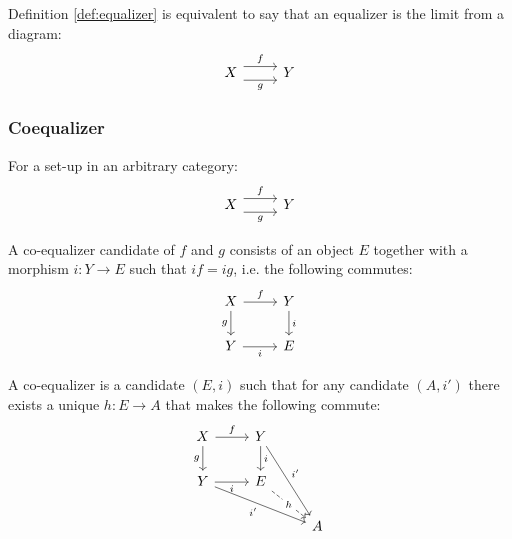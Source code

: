 \begin{definition}
  Definition \ref{def:equalizer} is equivalent to say that an equalizer is
  the limit from a diagram:
  \[\begin{tikzcd}[ampersand replacement=\&]
    X \& Y
    \arrow["f", shift left=2, from=1-1, to=1-2]
    \arrow["g"', shift right=2, from=1-1, to=1-2]
  \end{tikzcd}\]
\end{definition}

\subsubsection*{Coequalizer}

\begin{definition}
  For a set-up in an arbitrary category:
  \parencite{leinster:basic_category_theory}
  \[\begin{tikzcd}[ampersand replacement=\&]
    X \& Y
    \arrow["f", shift left=2, from=1-1, to=1-2]
    \arrow["g"', shift right=2, from=1-1, to=1-2]
  \end{tikzcd}\]

  A co-equalizer candidate of $f$ and $g$ consists of an object $E$ together
  with a morphism $i:Y\to E$ such that $if = ig$, i.e. the following commutes:
  \[\begin{tikzcd}[ampersand replacement=\&]
    X \& Y \\
    Y \& E
    \arrow["i", from=1-2, to=2-2]
    \arrow["i"', from=2-1, to=2-2]
    \arrow["g"', from=1-1, to=2-1]
    \arrow["f", from=1-1, to=1-2]
  \end{tikzcd}\]

  A co-equalizer is a candidate $(E, i)$ such that for any candidate $(A, i')$
  there exists a unique $h: E\to A$ that makes the following commute:
  \[\begin{tikzcd}[ampersand replacement=\&]
    X \& Y \\
    Y \& E \\
    \&\& A
    \arrow["i", from=1-2, to=2-2]
    \arrow["i"', from=2-1, to=2-2]
    \arrow["g"', from=1-1, to=2-1]
    \arrow["f", from=1-1, to=1-2]
    \arrow["{i'}"', from=2-1, to=3-3]
    \arrow["{i'}", from=1-2, to=3-3]
    \arrow["h"{description}, dashed, from=2-2, to=3-3]
  \end{tikzcd}\]
\end{definition}

\begin{definition}

\end{definition}